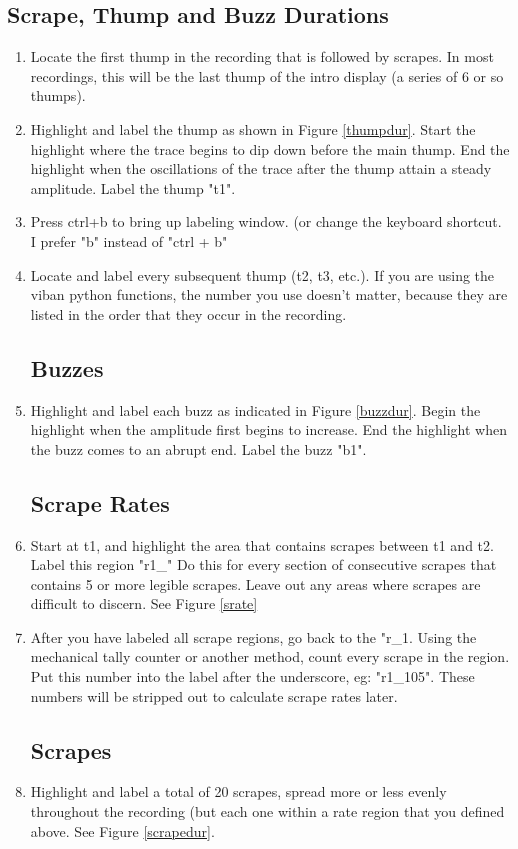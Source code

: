 \documentclass[11 pt]{article}
\begin{document}
\subsection{Scrape, Thump and Buzz Durations}
\begin{enumerate}
\subsection {Thumps}
\item Locate the first thump in the recording that is followed by scrapes.  In most recordings, this will be the last thump of the intro display (a series of 6 or so thumps).
\item{Highlight and label the thump as shown in Figure \ref{thumpdur}.  Start the highlight where the trace begins to dip down before the main thump.  End the highlight when the oscillations of the trace after the thump attain a steady amplitude. Label the thump "t1".}
\item{Press ctrl+b to bring up labeling window. (or change the keyboard shortcut.  I prefer "b" instead of "ctrl + b"}
\item Locate and label every subsequent thump (t2, t3, etc.).  If you are using the viban python functions, the number you use doesn't matter, because they are listed in the order that they occur in the recording.

\subsection {Buzzes}
\item Highlight and label  each buzz as indicated in Figure \ref{buzzdur}. Begin the highlight when the amplitude first begins to increase.  End the highlight when the buzz comes to an abrupt end. Label the buzz "b1".
\subsection {Scrape Rates}
\item {Start at t1, and highlight the area that contains scrapes between t1 and t2. Label this region "r1\_" Do this for every section of consecutive scrapes that contains 5 or more legible scrapes.  Leave out any areas where scrapes are difficult to discern.  See Figure \ref{srate}}
\item After you have labeled all scrape regions, go back to the "r\_1.  Using the mechanical tally counter or another method, count every scrape in the region.  Put this number into the label after the underscore, eg: "r1\_105".  These numbers will be stripped out to calculate scrape rates later.
\subsection{Scrapes}
\item Highlight and label a total of 20 scrapes, spread more or less evenly throughout the recording (but each one within a rate region that you defined above.  See Figure \ref{scrapedur}.
\end{enumerate}
\end{document}
